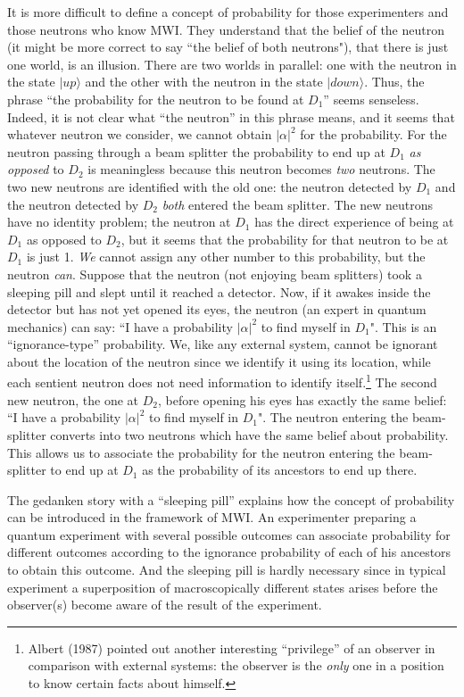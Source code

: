 \documentclass[12pt]{article}
\begin{document}
It is more difficult to define a concept of probability for those
experimenters and those neutrons who know MWI. They understand that
the belief of the neutron (it might be more correct to say ``the
belief of both neutrons"), that there is just one world, is an
illusion.  There are two worlds in parallel: one with the neutron in
the state $|up\rangle$ and the other with the neutron in the state
$|down\rangle$.  Thus, the phrase ``the probability for the neutron to
be found at $D_1$'' seems senseless.  Indeed, it is not clear what
``the neutron'' in this phrase means, and it seems that whatever
neutron we consider, we cannot obtain $|\alpha|^2$ for the
probability. For the neutron passing through a beam splitter the
probability to end up at $D_1$ {\it as opposed} to $D_2$ is
meaningless because this neutron becomes {\it two} neutrons.  The two
new neutrons are identified with the old one: the neutron detected by
$D_1$ and the neutron detected by $D_2$ {\it both} entered the beam
splitter.  The new neutrons have no identity problem; the neutron at
$D_1$ has the direct experience of being at $D_1$ as opposed to $D_2$,
but it seems that the probability for that neutron to be at $D_1$ is
just 1.  {\it We} cannot assign any other number to this probability,
but the neutron {\it can}.  Suppose that the neutron (not enjoying
beam splitters) took a sleeping pill and slept until it reached a
detector.  Now, if it awakes inside the detector but has not yet
opened its eyes, the neutron (an expert in quantum mechanics) can say:
``I have a probability $|\alpha|^2$ to find myself in $D_1$".  This is
an ``ignorance-type'' probability. We, like any external system,
cannot be ignorant about the location of the neutron since we identify
it using its location, while each sentient neutron does not need
information to identify itself.\footnote{Albert (1987) pointed out
  another interesting ``privilege'' of an observer in comparison with
  external systems: the observer is the {\it only} one in a position
  to know certain facts about himself.} The second new neutron, the
one at $D_2$, before opening his eyes has exactly the same belief: ``I
have a probability $|\alpha|^2$ to find myself in $D_1$". The neutron
entering the beam-splitter converts into two neutrons which have the
same belief about probability. This allows us to associate the
probability for the neutron entering the beam-splitter to end up at
$D_1$ as the probability of its ancestors to end up there.

The gedanken story with a ``sleeping pill'' explains how the concept
of probability can be introduced in the framework of MWI. An
experimenter preparing a quantum experiment with several possible
outcomes can associate probability for different outcomes according to
the ignorance probability of each of his ancestors to obtain this
outcome. And the sleeping pill is hardly necessary since in typical
experiment a superposition of macroscopically different states arises
before the observer(s) become aware of the result of the experiment.
\end{document}
